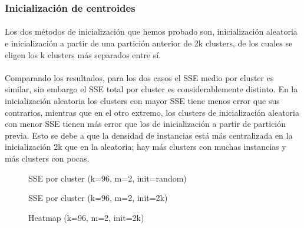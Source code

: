 \documentclass[10pt,a4paper]{article}
\begin{document}
	\subsubsection{Inicialización de centroides}
	\paragraph{}
	Los dos métodos de inicialización que hemos probado son, inicialización aleatoria e inicialización a partir de una partición anterior de 2k clusters, de los cuales se eligen los k clusters más separados entre sí.
	\paragraph{}
	Comparando los resultados, para los dos casos el SSE medio por cluster es similar, sin embargo el SSE total por cluster es considerablemente distinto. En la inicialización aleatoria los clusters con mayor SSE tiene menos error que sus contrarios, mientras que en el otro extremo, los clusters de inicialización aleatoria con menor SSE tienen más error que los de inicialización a partir de partición previa. Esto se debe a que la densidad de instancias está más centralizada en la inicialización 2k que en la aleatoria; hay más clusters con muchas instancias y más clusters con pocas.
	\begin{figure}
		\centering
		\caption{SSE por cluster (k=96, m=2, init=random)}
		\label{fig:sse_96_2_random}
	\end{figure}
	\begin{figure}
		\centering
		\caption{SSE por cluster (k=96, m=2, init=2k)}
		\label{fig:sse_96_2_2k}
	\end{figure}
	\begin{figure}
		\centering
		\caption{Heatmap (k=96, m=2, init=2k)}
		\label{fig:htm_96_2_2k}
	\end{figure}
\end{document}
